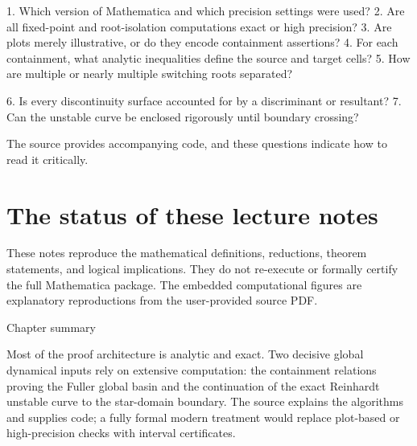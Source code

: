 1. Which version of Mathematica and which precision settings were used? 2. Are all fixed-point and root-isolation computations exact or high precision? 3. Are plots merely illustrative, or do they encode containment assertions? 4. For each containment, what analytic inequalities define the source and target cells? 5. How are multiple or nearly multiple switching roots separated?


6. Is every discontinuity surface accounted for by a discriminant or resultant? 7. Can the unstable curve be enclosed rigorously until boundary crossing?


The source provides accompanying code, and these questions indicate how to read it critically.


\section{The status of these lecture notes}

These notes reproduce the mathematical definitions, reductions, theorem statements, and logical implications. They do not re-execute or formally certify the full Mathematica package. The embedded computational figures are explanatory reproductions from the user-provided source PDF.


\begin{insightbox}{Chapter summary}
\end{insightbox}

Most of the proof architecture is analytic and exact. Two decisive global dynamical inputs rely on extensive computation: the containment relations proving the Fuller global basin and the continuation of the exact Reinhardt unstable curve to the star-domain boundary. The source explains the algorithms and supplies code; a fully formal modern treatment would replace plot-based or high-precision checks with interval certificates.

